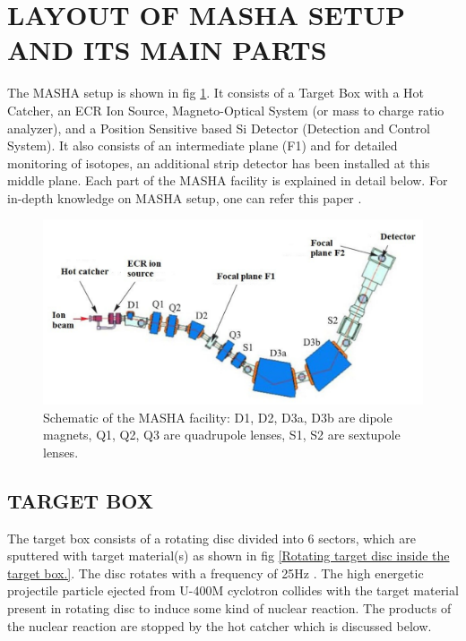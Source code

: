 \documentclass[12pt]{article}
\begin{document}
\section{LAYOUT OF MASHA SETUP AND ITS MAIN PARTS}
The MASHA setup is shown in fig \ref{Schematic of the MASHA facility: D1, D2, D3a, D3b are dipole magnets, Q1, Q2, Q3 are quadrupole lenses, S1, S2 are sextupole lenses.}. It consists of a Target Box with a Hot Catcher, an ECR Ion Source, Magneto-Optical System (or mass to charge ratio analyzer), and a Position Sensitive based Si Detector (Detection and Control System). It also consists of an intermediate plane (F1) and for detailed monitoring of isotopes, an additional strip detector has been installed at this middle plane. Each part of the MASHA facility is explained in detail below. For in-depth knowledge on MASHA setup, one can refer this paper \cite{vedeneev2017current}.

\begin{figure}[h]
\centering
\includegraphics[scale=0.6]{MASHA.png}
\caption{Schematic of the MASHA facility: D1, D2, D3a, D3b are dipole magnets, Q1, Q2, Q3 are quadrupole lenses, S1, S2 are sextupole lenses.}
\label{Schematic of the MASHA facility: D1, D2, D3a, D3b are dipole magnets, Q1, Q2, Q3 are quadrupole lenses, S1, S2 are sextupole lenses.}
\end{figure}


\subsection{TARGET BOX}
The target box consists of a rotating disc divided into 6 sectors, which are sputtered with target material(s) as shown in fig \ref{Rotating target disc inside the target box.}. The disc rotates with a frequency of 25Hz \cite{vedeneev2017current}. The high energetic projectile particle ejected from U-400M cyclotron collides with the target material present in rotating disc to induce some kind of nuclear reaction. The products of the nuclear reaction are stopped by the hot catcher which is discussed below.
\end{document}
